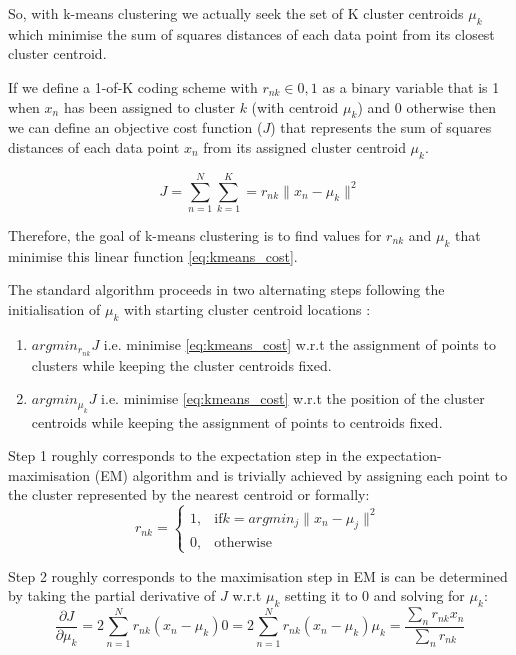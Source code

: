 So, with k-means clustering we actually seek the set of K cluster centroids \({\mu_{k}}\) 
which minimise the sum of squares distances of each data point from its closest cluster centroid.
\citep{Bishop2006}

If we define a 1-of-K coding scheme with \(r_{nk} \in {0,1}\) as a binary variable that is 1 when \(x_{n}\) has been
assigned to cluster \(k\) (with centroid \(\mu_{k}\)) and 0 otherwise then we can define an objective cost function (\(J\)) 
that represents the sum of squares distances of each data point \(x_{n}\) from its assigned cluster centroid \(\mu_{k}\).

\[ 
    J = \sum_{n=1}^{N}\sum_{k=1}^{K} = r_{nk} \|x_{n} - \mu_{k}\|^{2}
    \label{eq:kmeans_cost}
\]

Therefore, the goal of k-means clustering is to find values for \({r_{nk}}\) and \({\mu_{k}}\) that minimise this linear 
function \ref{eq:kmeans_cost}.
\citep{Bishop2006}


The standard algorithm proceeds in two alternating steps following the initialisation of \(\mu_{k}\) with starting
cluster centroid locations \citep{Forgy1965,Lloyd1982}:
\begin{enumerate}
    \item \(argmin_{r_{nk}} J\) i.e. minimise \ref{eq:kmeans_cost} w.r.t the assignment of points to clusters while keeping
        the cluster centroids fixed.
    \item \(argmin_{\mu_{k}} J\) i.e. minimise \ref{eq:kmeans_cost} w.r.t the position of the cluster centroids while keeping
        the assignment of points to centroids fixed.
\end{enumerate}

Step 1 roughly corresponds to the expectation step in the expectation-maximisation (EM) algorithm and is trivially achieved by 
assigning each point to the cluster represented by the nearest centroid or formally:
\[
    r_{nk} = 
    \begin{cases}
        1,& \text{if} k=argmin_{j} \|x_{n} - \mu_{j}\|^{2}\\
        0,& \text{otherwise}
    \end{cases}
\]

Step 2 roughly corresponds to the maximisation step in EM is can be determined by taking the partial derivative of \(J\) w.r.t 
\(\mu_{k}\) setting it to 0 and solving for \(\mu_{k}\):
\[
    \frac{\partial J}{\partial \mu_{k}} = 2 \sum_{n=1}^{N} r_{nk} (x_{n} - \mu_{k})
    0 = 2 \sum_{n=1}^{N} r_{nk} (x_{n} - \mu_{k})
    \mu_{k} = \frac{\sum_{n} r_{nk}x_{n}}{\sum_{n} r_{nk}}
\]

